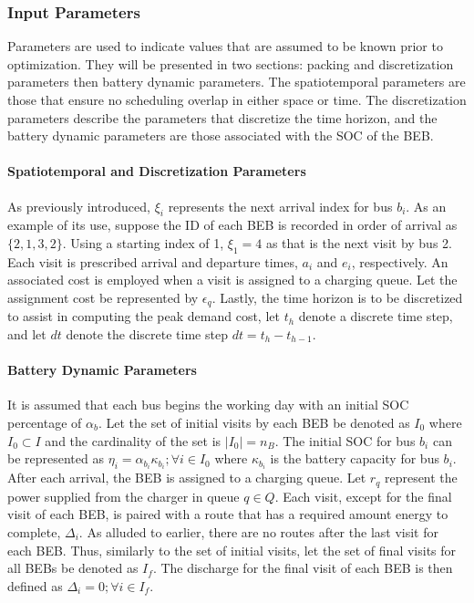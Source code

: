 \documentclass[energies,article,submit,moreauthors]{Definitions/mdpi}
\newcommand{\Iset}{I}                       %
\newcommand{\Isetinit}{I_0}                 %
\newcommand{\Isetfinal}{I_f}                %
\begin{document}
\subsubsection{Input Parameters}
\label{sec:sa-input-variables}
Parameters are used to indicate values that are assumed to be known prior to optimization. They will be presented in two
sections: packing and discretization parameters then battery dynamic parameters. The spatiotemporal parameters are those
that ensure no scheduling overlap in either space or time. The discretization parameters describe the parameters that
discretize the time horizon, and the battery dynamic parameters are those associated with the SOC of the BEB.

\paragraph{Spatiotemporal and Discretization Parameters}
\label{sec:sa-packing-and-discretization-paramaters}
As previously introduced, \(\xi_i\) represents the next arrival index for bus \(b_i\). As an example of its use, suppose the
ID of each BEB is recorded in order of arrival as \(\{ 2,1,3,2 \}\). Using a starting index of 1, \(\xi_1 = 4\) as that is the
next visit by bus 2. Each visit is prescribed arrival and departure times, \(a_i\) and \(e_i\), respectively. An associated
cost is employed when a visit is assigned to a charging queue. Let the assignment cost be represented by \(\epsilon_q\). Lastly,
the time horizon is to be discretized to assist in computing the peak demand cost, let \(t_h\) denote a discrete time
step, and let \(dt\) denote the discrete time step \(dt = t_h - t_{h-1}\).

\paragraph{Battery Dynamic Parameters}
\label{sec:sa-battery-dynamic-parameters}
It is assumed that each bus begins the working day with an initial SOC percentage of \(\alpha_b\). Let the set of initial
visits by each BEB be denoted as \(\Isetinit\) where \(\Isetinit \subset \Iset\) and the cardinality of the set is \(\lvert
\Isetinit \rvert = n_B\). The initial SOC for bus \(b_i\) can be represented as \(\eta_{i} = \alpha_{b_i}\kappa_{b_i}; \forall i \in \Isetinit\)
where \(\kappa_{b_i}\) is the battery capacity for bus \(b_i\). After each arrival, the BEB is assigned to a charging queue. Let
\(r_q\) represent the power supplied from the charger in queue \(q \in Q\). Each visit, except for the final visit of each
BEB, is paired with a route that has a required amount energy to complete, \(\Delta_i\). As alluded to earlier, there are no
routes after the last visit for each BEB. Thus, similarly to the set of initial visits, let the set of final visits for
all BEBs be denoted as \(\Isetfinal\). The discharge for the final visit of each BEB is then defined as \(\Delta_{i} = 0; \forall i \in
\Isetfinal\).
\end{document}
